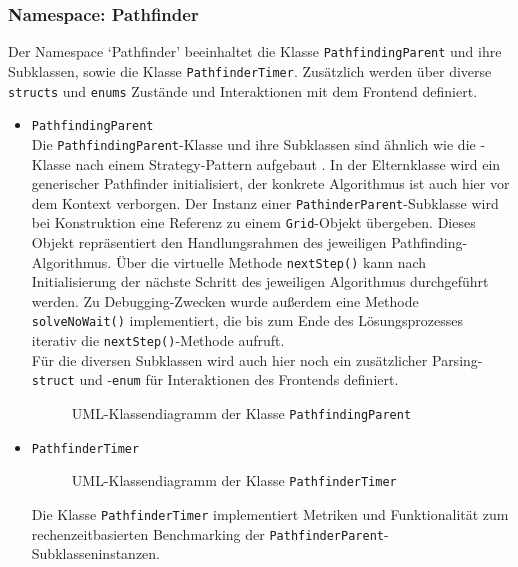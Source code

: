 \subsubsection{Namespace: Pathfinder}
\label{subsubsec:aufbau_backend_ueberblick_pathfinder}
Der Namespace `Pathfinder' beeinhaltet die Klasse \texttt{PathfindingParent} und ihre Subklassen, sowie die Klasse \texttt{PathfinderTimer}.
Zusätzlich werden über diverse \texttt{structs} und \texttt{enums} Zustände und Interaktionen mit dem Frontend definiert.
\begin{itemize}
    \item \texttt{PathfindingParent}\\
    Die \texttt{PathfindingParent}-Klasse und ihre Subklassen sind ähnlich wie die -Klasse nach einem Strategy-Pattern aufgebaut \cite{nesteruk2021}.
    In der Elternklasse wird ein generischer Pathfinder initialisiert, der konkrete Algorithmus ist auch hier vor dem Kontext verborgen.
    Der Instanz einer \texttt{PathinderParent}-Subklasse wird bei Konstruktion eine Referenz zu einem \texttt{Grid}-Objekt übergeben.
    Dieses Objekt repräsentiert den Handlungsrahmen des jeweiligen Pathfinding-Algorithmus.
    Über die virtuelle Methode \texttt{nextStep()} kann nach Initialisierung der nächste Schritt des jeweiligen Algorithmus durchgeführt werden.
    Zu Debugging-Zwecken wurde außerdem eine Methode \texttt{solveNoWait()} implementiert, die bis zum Ende des Lösungsprozesses
    iterativ die \texttt{nextStep()}-Methode aufruft.\\
    Für die diversen Subklassen wird auch hier noch ein zusätzlicher Parsing-\texttt{struct} und -\texttt{enum} für Interaktionen des Frontends definiert.
    \begin{figure}[H]
              \vspace{-0.5cm}
              \centering
              
              \caption{UML-Klassendiagramm der Klasse \texttt{PathfindingParent}}
              \label{fig:uml_pathfinder}
    \end{figure}
    \item \texttt{PathfinderTimer}\\
    \begin{figure}[H]
        \vspace{-0.5cm}
        \centering
        
        \caption{UML-Klassendiagramm der Klasse \texttt{PathfinderTimer}}
        \label{fig:uml_pathfinder_timer}
    \end{figure}
    Die Klasse \texttt{PathfinderTimer} implementiert Metriken und Funktionalität zum rechenzeitbasierten Benchmarking der \texttt{PathfinderParent}-Subklasseninstanzen.
\end{itemize}
